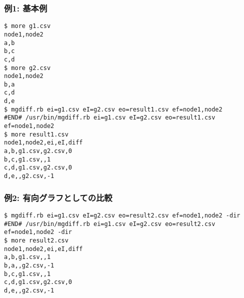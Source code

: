 \subsubsection*{例1: 基本例}



\begin{Verbatim}[baselinestretch=0.7,frame=single]
$ more g1.csv
node1,node2
a,b
b,c
c,d
$ more g2.csv
node1,node2
b,a
c,d
d,e
$ mgdiff.rb ei=g1.csv eI=g2.csv eo=result1.csv ef=node1,node2
#END# /usr/bin/mgdiff.rb ei=g1.csv eI=g2.csv eo=result1.csv ef=node1,node2
$ more result1.csv
node1,node2,ei,eI,diff
a,b,g1.csv,g2.csv,0
b,c,g1.csv,,1
c,d,g1.csv,g2.csv,0
d,e,,g2.csv,-1
\end{Verbatim}
\subsubsection*{例2: 有向グラフとしての比較}



\begin{Verbatim}[baselinestretch=0.7,frame=single]
$ mgdiff.rb ei=g1.csv eI=g2.csv eo=result2.csv ef=node1,node2 -dir
#END# /usr/bin/mgdiff.rb ei=g1.csv eI=g2.csv eo=result2.csv ef=node1,node2 -dir
$ more result2.csv
node1,node2,ei,eI,diff
a,b,g1.csv,,1
b,a,,g2.csv,-1
b,c,g1.csv,,1
c,d,g1.csv,g2.csv,0
d,e,,g2.csv,-1
\end{Verbatim}
